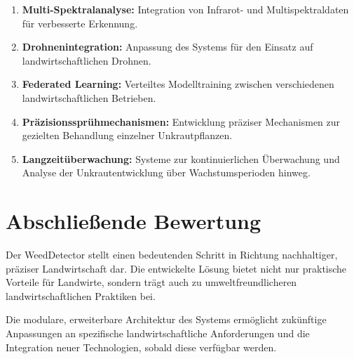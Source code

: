 \documentclass[12pt, a4paper]{scrreprt}
\begin{document}
\begin{enumerate}
    \item \textbf{Multi-Spektralanalyse:} Integration von Infrarot- und Multispektraldaten für verbesserte Erkennung.
    \item \textbf{Drohnenintegration:} Anpassung des Systems für den Einsatz auf landwirtschaftlichen Drohnen.
    \item \textbf{Federated Learning:} Verteiltes Modelltraining zwischen verschiedenen landwirtschaftlichen Betrieben.
    \item \textbf{Präzisionssprühmechanismen:} Entwicklung präziser Mechanismen zur gezielten Behandlung einzelner Unkrautpflanzen.
    \item \textbf{Langzeitüberwachung:} Systeme zur kontinuierlichen Überwachung und Analyse der Unkrautentwicklung über Wachstumsperioden hinweg.
\end{enumerate}

\section{Abschließende Bewertung}
Der WeedDetector stellt einen bedeutenden Schritt in Richtung nachhaltiger, präziser Landwirtschaft dar. Die entwickelte Lösung bietet nicht nur praktische Vorteile für Landwirte, sondern trägt auch zu umweltfreundlicheren landwirtschaftlichen Praktiken bei.

Die modulare, erweiterbare Architektur des Systems ermöglicht zukünftige Anpassungen an spezifische landwirtschaftliche Anforderungen und die Integration neuer Technologien, sobald diese verfügbar werden.
\end{document}
